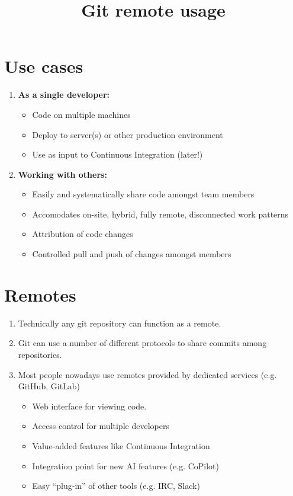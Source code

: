 \documentclass[slides]{pgnotes}
\title{Git remote usage}
\begin{document}
\maketitle

\tableofcontents

\section{Use cases}

\begin{enumerate}
\item \textbf{As a single developer:}
  \begin{itemize}
  \item Code on multiple machines
  \item Deploy to server(s) or other production environment
  \item Use as input to Continuous Integration (later!)
  \end{itemize}
\item \textbf{Working with others:}
  \begin{itemize}
  \item Easily and systematically share code amongst team members
  \item Accomodates on-site, hybrid, fully remote, disconnected work patterns
  \item Attribution of code changes
  \item Controlled pull and push of changes amongst members
  \end{itemize}
\end{enumerate}



\section{Remotes}

\begin{enumerate}
\item Technically any git repository can function as a remote.
\item Git can use a number of different protocols to share commits among repositories.
\item Most people nowadays use remotes provided by dedicated services (e.g. GitHub, GitLab)
  \begin{itemize}
  \item Web interface for viewing code.    
  \item Access control for multiple developers
  \item Value-added features like Continuous Integration
  \item Integration point for new AI features (e.g. CoPilot)
  \item Easy ``plug-in'' of other tools (e.g. IRC, Slack)
  \end{itemize}
\end{enumerate}
\end{document}
